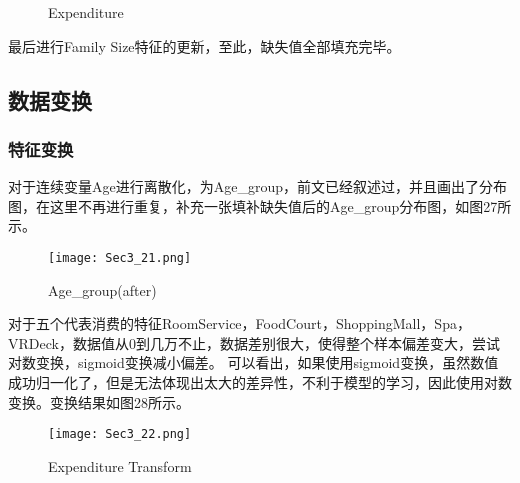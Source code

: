 \documentclass[../main.tex]{subfiles}
\begin{document}
            \begin{figure}[H]
                \centering
                

                \caption{Expenditure}
            \end{figure}

            最后进行Family Size特征的更新，至此，缺失值全部填充完毕。

    \subsection{数据变换}

        \subsubsection{特征变换}

            对于连续变量Age进行离散化，为Age\_group，前文已经叙述过，并且画出了分布图，在这里不再进行重复，补充一张填补缺失值后的Age\_group分布图，如图27所示。

            \begin{figure}[H]
                \centering
                \texttt{[image: Sec3\_21.png]}
                \caption{Age\_group(after)}
            \end{figure}

            对于五个代表消费的特征RoomService，FoodCourt，ShoppingMall，Spa，VRDeck，数据值从0到几万不止，数据差别很大，使得整个样本偏差变大，尝试对数变换，sigmoid变换减小偏差。
            可以看出，如果使用sigmoid变换，虽然数值成功归一化了，但是无法体现出太大的差异性，不利于模型的学习，因此使用对数变换。变换结果如图28所示。

            \begin{figure}[H]
                \centering
                \texttt{[image: Sec3\_22.png]}
                \caption{Expenditure Transform}
            \end{figure}
\end{document}
